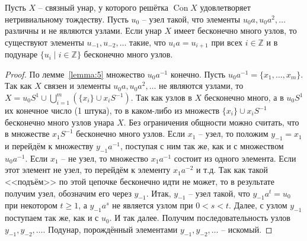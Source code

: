 \documentclass[11pt,twoside,final
]{article}
\def\Con{\operatorname{Con}}
\begin{document}
\begin{lemma} \label{lemma:6}
	Пусть $X$ -- связный унар, у которого решётка $\Con X$ удовлетворяет нетривиальному тождеству.
	Пусть $u_0$ -- узел такой, что элементы $u_0 a, u_0 a^2, \ldots$ различны и не являются узлами.
	Если унар $X$ имеет бесконечно много узлов, то существуют элементы $u_{-1}, u_{-2}, \ldots$ такие, что $u_i a = u_{i + 1}$ при всех $i \in \mathbb{Z}$ и в подунаре $\{ u_i \mid i \in \mathbb{Z} \}$ бесконечно много узлов.
\end{lemma}
\begin{proof}
	По лемме~\ref{lemma:5} множество $u_0 a^{-1}$ конечно.
	Пусть $u_0 a^{-1} = \{ x_1, \ldots, x_m \}$.
	Так как $X$ связен и элементы $u_0 a, u_0 a^2, \ldots$ не являются узлами, то $X = u_0 S^1 \cup \bigcup_{i=1}^m (\{ x_i \} \cup x_i S^{-1})$.
	Так как узлов в $X$ бесконечно много, а в $u_0 S^1$ их конечное число (1 штука), то в каком-либо из множеств $\{ x_i \} \cup x_i S^{-1}$ бесконечно много узлов унара $X$.
	Без ограничения общности можно считать, что в множестве $x_1 S^{-1}$ бесконечно много узлов.
	Если $x_1$ -- узел, то положим $y_{-1} = x_1$ и перейдём к множеству $y_{-1} a^{-1}$, поступая с ним так же, как и с множеством $u_0 a^{-1}$.
	Если $x_1$ -- не узел, то множество $x_1 a^{-1}$ состоит из одного элемента.
	Если этот элемент не узел, то перейдём к элементу $x_1 a^{-2}$ и т.д.
	Так как такой <<подъём>> по этой цепочке бесконечно идти не может, то в результате получим узел, обозначим его через $y_{-1}$.
	Итак, $y_{-1}$ -- узел такой, что $y_{-1} a^t = u_0$ при некотором $t \geqslant 1$, а $y_{-1} a^s$ не является узлом при $0 < s < t$.
	Далее, с узлом $y_{-1}$ поступаем так же, как и с $u_0$.
	И так далее.
	Получим последовательность узлов $y_{-1}, y_{-2}, \ldots$.
	Подунар, порождённый элементами $y_{-1}, y_{-2}, \ldots$ -- искомый.
\end{proof}
\end{document}
